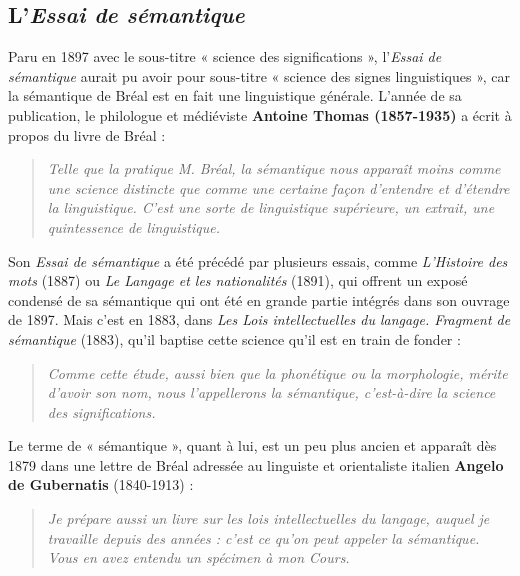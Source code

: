 \subsection{L’\textit{Essai de sémantique}}
Paru en 1897 avec le sous-titre « science des significations », l’\textit{Essai de sémantique} aurait pu avoir pour sous-titre « science des signes linguistiques », car la sémantique de Bréal est en fait une linguistique générale. L’année de sa publication, le philologue et médiéviste \textbf{Antoine Thomas (1857-1935)} a écrit à propos du livre de Bréal :
\begin{quote}\small\itshape
Telle que la pratique M. Bréal, la sémantique nous apparaît moins comme une science distincte que comme une certaine façon d’entendre et d’étendre la linguistique. C’est une sorte de linguistique supérieure, un extrait, une quintessence de linguistique.
\end{quote}
Son \textit{Essai de sémantique} a été précédé par plusieurs essais, comme \textit{L’Histoire des mots} (1887) ou \textit{Le Langage et les nationalités} (1891), qui offrent un exposé condensé de sa sémantique qui ont été en grande partie intégrés dans son ouvrage de 1897. Mais c’est en 1883, dans \textit{Les Lois intellectuelles du langage. Fragment de sémantique} (1883), qu’il baptise cette science qu’il est en train de fonder :
\begin{quote}\small\itshape
Comme cette étude, aussi bien que la phonétique ou la morphologie, mérite d’avoir son nom, nous l’appellerons la sémantique, c’est-à-dire la science des significations.
\end{quote}
Le terme de « sémantique », quant à lui, est un peu plus ancien et apparaît dès 1879 dans une lettre de Bréal adressée au linguiste et orientaliste italien \textbf{Angelo de Gubernatis} (1840-1913) :
\begin{quote}\small\itshape
Je prépare aussi un livre sur les lois intellectuelles du langage, auquel je travaille depuis des années : c’est ce qu’on peut appeler la sémantique. Vous en avez entendu un spécimen à mon Cours.
\end{quote}

